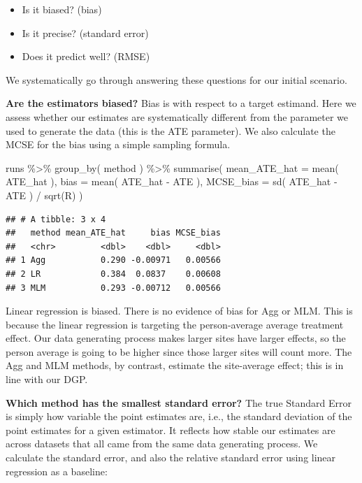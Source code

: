 \documentclass[
]{book}
\newenvironment{Shaded}{\begin{snugshade}}{\end{snugshade}}
\newcommand{\AttributeTok}[1]{\textcolor[rgb]{0.77,0.63,0.00}{#1}}
\newcommand{\FunctionTok}[1]{\textcolor[rgb]{0.00,0.00,0.00}{#1}}
\newcommand{\NormalTok}[1]{#1}
\newcommand{\SpecialCharTok}[1]{\textcolor[rgb]{0.00,0.00,0.00}{#1}}
\providecommand{\tightlist}{%
  \setlength{\itemsep}{0pt}\setlength{\parskip}{0pt}}
\begin{document}
\begin{itemize}
\tightlist
\item
  Is it biased? (bias)
\item
  Is it precise? (standard error)
\item
  Does it predict well? (RMSE)
\end{itemize}

We systematically go through answering these questions for our initial scenario.

\textbf{Are the estimators biased?}
Bias is with respect to a target estimand.
Here we assess whether our estimates are systematically different from the parameter we used to generate the data (this is the ATE parameter).
We also calculate the MCSE for the bias using a simple sampling formula.

\begin{Shaded}
\begin{Highlighting}[]
\NormalTok{runs }\SpecialCharTok{\%\textgreater{}\%} 
  \FunctionTok{group\_by}\NormalTok{( method ) }\SpecialCharTok{\%\textgreater{}\%}
  \FunctionTok{summarise}\NormalTok{( }
    \AttributeTok{mean\_ATE\_hat =} \FunctionTok{mean}\NormalTok{( ATE\_hat ),}
    \AttributeTok{bias =} \FunctionTok{mean}\NormalTok{( ATE\_hat }\SpecialCharTok{{-}}\NormalTok{ ATE ),}
    \AttributeTok{MCSE\_bias =} \FunctionTok{sd}\NormalTok{( ATE\_hat }\SpecialCharTok{{-}}\NormalTok{ ATE ) }\SpecialCharTok{/} \FunctionTok{sqrt}\NormalTok{(R)}
\NormalTok{  )}
\end{Highlighting}
\end{Shaded}

\begin{verbatim}
## # A tibble: 3 x 4
##   method mean_ATE_hat     bias MCSE_bias
##   <chr>         <dbl>    <dbl>     <dbl>
## 1 Agg           0.290 -0.00971   0.00566
## 2 LR            0.384  0.0837    0.00608
## 3 MLM           0.293 -0.00712   0.00566
\end{verbatim}

Linear regression is biased. There is no evidence of bias for Agg or MLM.
This is because the linear regression is targeting the person-average average treatment effect.
Our data generating process makes larger sites have larger effects, so the person average is going to be higher since those larger sites will count more.
The Agg and MLM methods, by contrast, estimate the site-average effect; this is in line with our DGP.

\textbf{Which method has the smallest standard error?}
The true Standard Error is simply how variable the point estimates are, i.e., the standard deviation of the point estimates for a given estimator.
It reflects how stable our estimates are across datasets that all came from the same data generating process.
We calculate the standard error, and also the relative standard error using linear regression as a baseline:
\end{document}
